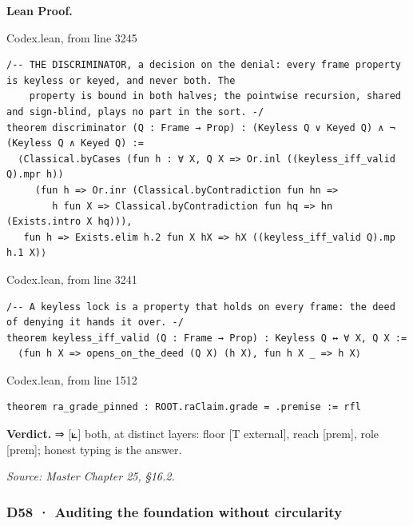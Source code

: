 \documentclass[10pt,twocolumn]{article}
\begin{document}
\textbf{Lean Proof.}

\begin{leanexcerpt}{Codex.lean, from line 3245}
\begin{lstlisting}[style=leanx,firstnumber=3245]
/-- THE DISCRIMINATOR, a decision on the denial: every frame property is keyless or keyed, and never both. The
    property is bound in both halves; the pointwise recursion, shared and sign-blind, plays no part in the sort. -/
theorem discriminator (Q : Frame → Prop) : (Keyless Q ∨ Keyed Q) ∧ ¬ (Keyless Q ∧ Keyed Q) :=
  ⟨Classical.byCases (fun h : ∀ X, Q X => Or.inl ((keyless_iff_valid Q).mpr h))
     (fun h => Or.inr (Classical.byContradiction fun hn =>
        h fun X => Classical.byContradiction fun hq => hn (Exists.intro X hq))),
   fun h => Exists.elim h.2 fun X hX => hX ((keyless_iff_valid Q).mp h.1 X)⟩
\end{lstlisting}
\end{leanexcerpt}

\begin{leanexcerpt}{Codex.lean, from line 3241}
\begin{lstlisting}[style=leanx,firstnumber=3241]
/-- A keyless lock is a property that holds on every frame: the deed of denying it hands it over. -/
theorem keyless_iff_valid (Q : Frame → Prop) : Keyless Q ↔ ∀ X, Q X :=
  ⟨fun h X => opens_on_the_deed (Q X) (h X), fun h X _ => h X⟩
\end{lstlisting}
\end{leanexcerpt}

\begin{leanexcerpt}{Codex.lean, from line 1512}
\begin{lstlisting}[style=leanx,firstnumber=1512]
theorem ra_grade_pinned : ROOT.raClaim.grade = .premise := rfl
\end{lstlisting}
\end{leanexcerpt}

\textbf{Verdict.} ⇒ {[}⟀{]} both, at distinct layers: floor {[}T
external{]}, reach {[}prem{]}, role {[}prem{]}; honest typing is the
answer.

\emph{Source: Master Chapter 25, §16.2.}

\hypertarget{d58-auditing-the-foundation-without-circularity}{%
\subsubsection{D58 · Auditing the foundation without
circularity}\label{d58-auditing-the-foundation-without-circularity}}
\end{document}

